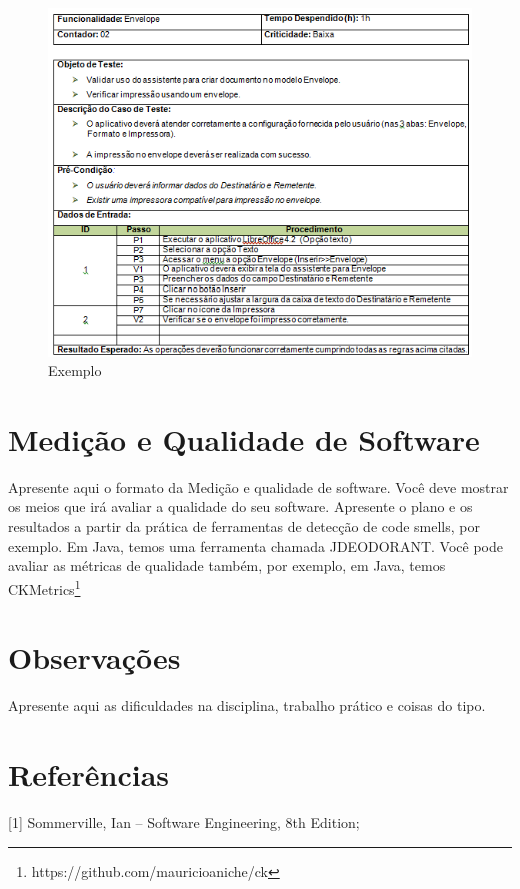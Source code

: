 \documentclass[a4paper, 12pt]{article}
\begin{document}
\begin{figure}[!ht]
\centering
\includegraphics[width=14cm]{img/Capturar.PNG}
\caption{Exemplo}
\end{figure}

\section{Medição e Qualidade de Software}

Apresente aqui o formato da Medição e qualidade de software. Você deve mostrar os meios que irá avaliar a qualidade do seu software. Apresente o plano e os resultados a partir da prática de ferramentas de detecção de code smells, por exemplo.  Em Java, temos uma  ferramenta chamada JDEODORANT.  Você pode avaliar as métricas de qualidade também, por exemplo, em Java, temos CKMetrics\footnote{https://github.com/mauricioaniche/ck}

\section{Observações}

Apresente aqui as dificuldades na disciplina,  trabalho prático e coisas do tipo. 

\newpage
\section{Referências}

[1] Sommerville, Ian -- Software Engineering, 8th Edition;
\end{document}
